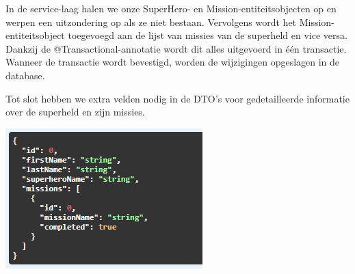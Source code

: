 In de service-laag halen we onze SuperHero- en Mission-entiteitsobjecten op en werpen  een uitzondering op als ze niet bestaan. Vervolgens wordt het Mission-entiteitsobject toegevoegd aan de lijst van missies van de superheld en vice versa. Dankzij de @Transactional-annotatie wordt dit alles uitgevoerd in één transactie. Wanneer de transactie wordt bevestigd, worden de wijzigingen opgeslagen in de database. 

Tot slot hebben we extra velden nodig in de DTO's voor gedetailleerde informatie over de superheld en zijn missies.

\includegraphics{./images/chapter-jpa/superhero_detail_dto}




